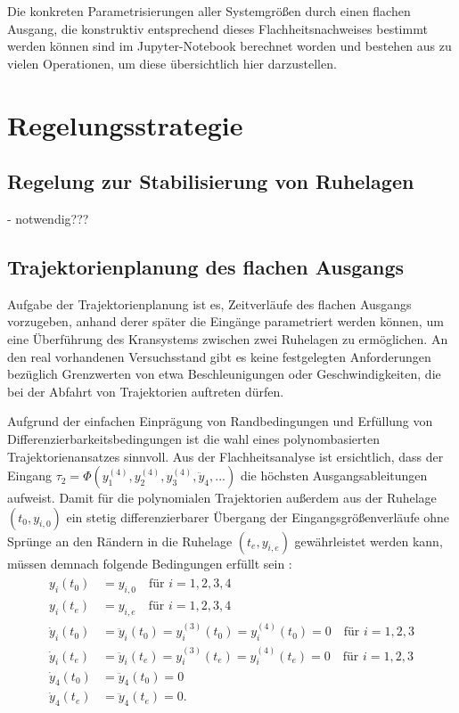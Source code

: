 Die konkreten Parametrisierungen aller Systemgrößen durch einen flachen Ausgang, die konstruktiv entsprechend dieses Flachheitsnachweises bestimmt werden können sind im Jupyter-Notebook berechnet worden und bestehen aus zu vielen Operationen, um diese übersichtlich hier darzustellen.

\chapter{Regelungsstrategie}

\section{Regelung zur Stabilisierung von Ruhelagen}
- notwendig???

\section{Trajektorienplanung des flachen Ausgangs}
Aufgabe der Trajektorienplanung ist es, Zeitverläufe des flachen Ausgangs vorzugeben, anhand derer später die Eingänge parametriert werden können, um eine Überführung des Kransystems zwischen zwei Ruhelagen zu ermöglichen. An den real vorhandenen Versuchsstand gibt es keine festgelegten Anforderungen bezüglich Grenzwerten von etwa Beschleunigungen oder Geschwindigkeiten, die bei der Abfahrt von Trajektorien auftreten dürfen.

Aufgrund der einfachen Einprägung von Randbedingungen und Erfüllung von Differenzierbarkeitsbedingungen ist die wahl eines polynombasierten Trajektorienansatzes sinnvoll. Aus der Flachheitsanalyse ist ersichtlich, dass der Eingang $\tau_2 = \Phi(y_1^{(4)}, y_2^{(4)}, y_3^{(4)}, \ddot{y}_4, ...)$ die höchsten Ausgangsableitungen aufweist. Damit für die polynomialen Trajektorien außerdem aus der Ruhelage $(t_0, y_{i, 0})$  ein stetig differenzierbarer Übergang der Eingangsgrößenverläufe ohne Sprünge an den Rändern in die Ruhelage $(t_e, y_{i, e})$ gewährleistet werden kann, müssen demnach folgende Bedingungen erfüllt sein \cite[S. 230]{NLRT_Roebenack}:
\begin{align}
	\begin{split}
	y_i(t_0) &= y_{i, 0}  \quad \text{für } i = 1,2,3,4 \\
	y_i(t_e) &= y_{i, e}  \quad \text{für } i = 1,2,3,4 \\
	\dot{y}_i(t_0) &= \ddot{y}_i(t_0) = y_i^{(3)}(t_0) = y_i^{(4)}(t_0) = 0 \quad \text{für } i = 1,2,3 \\
	\dot{y}_i(t_e) &= \ddot{y}_i(t_e) = y_i^{(3)}(t_e) = y_i^{(4)}(t_e) = 0 \quad \text{für } i = 1,2,3 \\
	\dot{y}_4(t_0) &= \ddot{y}_4(t_0) = 0 \\
	\dot{y}_4(t_e) &= \ddot{y}_4(t_e) = 0.
	\end{split}
\end{align}

